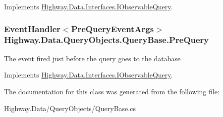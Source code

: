 Implements \hyperlink{interface_highway_1_1_data_1_1_interfaces_1_1_i_observable_query_ac8cff5ce936c3611f965796ba9707c49}{Highway.\-Data.\-Interfaces.\-I\-Observable\-Query}.

\hypertarget{class_highway_1_1_data_1_1_query_objects_1_1_query_base_a0f4a7c6fcd8e32c461633855ed00f824}{
\subsubsection[{Pre\-Query}]{\setlength{\rightskip}{0pt plus 5cm}Event\-Handler$<${\bf Pre\-Query\-Event\-Args}$>$ Highway.\-Data.\-Query\-Objects.\-Query\-Base.\-Pre\-Query}}\label{class_highway_1_1_data_1_1_query_objects_1_1_query_base_a0f4a7c6fcd8e32c461633855ed00f824}


The event fired just before the query goes to the database 



Implements \hyperlink{interface_highway_1_1_data_1_1_interfaces_1_1_i_observable_query_a1687e8dccf74ef87f98fe8ef6f1c99c3}{Highway.\-Data.\-Interfaces.\-I\-Observable\-Query}.



The documentation for this class was generated from the following file\-:\begin{DoxyCompactItemize}
\item 
Highway.\-Data/\-Query\-Objects/Query\-Base.\-cs\end{DoxyCompactItemize}
